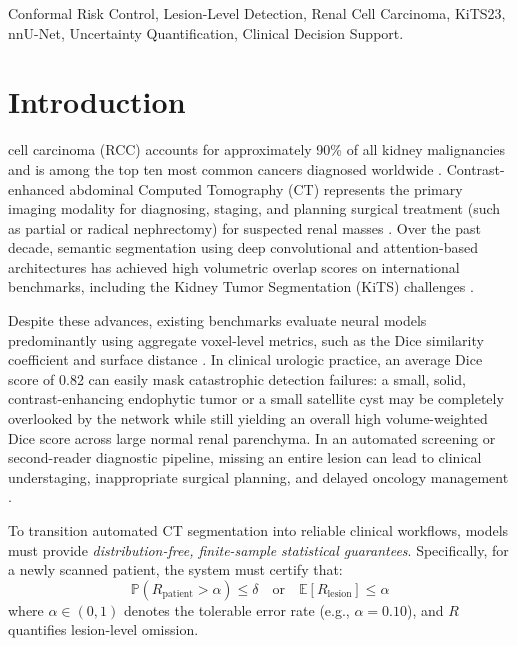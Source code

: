 \documentclass[journal,10pt,twocolumn]{IEEEtran}
\begin{document}
\begin{IEEEkeywords}
Conformal Risk Control, Lesion-Level Detection, Renal Cell Carcinoma, KiTS23, nnU-Net, Uncertainty Quantification, Clinical Decision Support.
\end{IEEEkeywords}

\section{Introduction}
 cell carcinoma (RCC) accounts for approximately 90\% of all kidney malignancies and is among the top ten most common cancers diagnosed worldwide \cite{Campbell2021aua,Ljungberg2022eau}. Contrast-enhanced abdominal Computed Tomography (CT) represents the primary imaging modality for diagnosing, staging, and planning surgical treatment (such as partial or radical nephrectomy) for suspected renal masses \cite{Amin2017ajcc}. Over the past decade, semantic segmentation using deep convolutional and attention-based architectures has achieved high volumetric overlap scores on international benchmarks, including the Kidney Tumor Segmentation (KiTS) challenges \cite{Heller2020kits19,Heller2023kits21,kits23challenge,Isensee2021nnunet}.

Despite these advances, existing benchmarks evaluate neural models predominantly using aggregate voxel-level metrics, such as the Dice similarity coefficient and surface distance \cite{Isensee2024nnunetRevisited}. In clinical urologic practice, an average Dice score of 0.82 can easily mask catastrophic detection failures: a small, solid, contrast-enhancing endophytic tumor or a small satellite cyst may be completely overlooked by the network while still yielding an overall high volume-weighted Dice score across large normal renal parenchyma. In an automated screening or second-reader diagnostic pipeline, missing an entire lesion can lead to clinical understaging, inappropriate surgical planning, and delayed oncology management \cite{Campbell2021aua}.

To transition automated CT segmentation into reliable clinical workflows, models must provide \emph{distribution-free, finite-sample statistical guarantees}. Specifically, for a newly scanned patient, the system must certify that:
\begin{equation}
\mathbb{P}\left(R_{\mathrm{patient}} > \alpha\right) \le \delta \quad \text{or} \quad \mathbb{E}\left[R_{\mathrm{lesion}}\right] \le \alpha
\end{equation}
where $\alpha \in (0, 1)$ denotes the tolerable error rate (e.g., $\alpha = 0.10$), and $R$ quantifies lesion-level omission.
\end{document}
